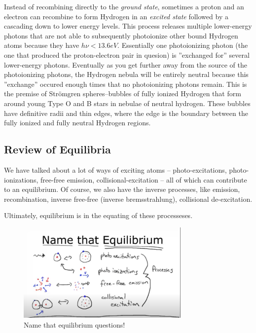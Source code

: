 \documentclass{article}
\begin{document}
Instead of recombining directly to the \emph{ground state}, sometimes a proton and an electron can recombine to form Hydrogen in an \emph{excited state} followed by a cascading down to lower energy levels. This process releases multiple lower-energy photons that are not able to subsequently photoionize other bound Hydrogen atoms because they have $h \nu < 13.6 eV$. Essentially one photoionizing photon (the one that produced the proton-electron pair in quesion) is ''exchanged for'' several lower-energy photons. Eventually as you get further away from the source of the photoionizing photons, the Hydrogen nebula will be entirely neutral because this ''exchange'' occured enough times that no photoionizing photons remain. This is the premise of Str\"{o}mgren spheres--bubbles of fully ionized Hydrogen that form around young Type O and B stars in nebulae of neutral hydrogen. These bubbles have definitive radii and thin edges, where the edge is the boundary between the fully ionized and fully neutral Hydrogen regions.

\subsection{Review of Equilibria}

We have talked about a lot of ways of exciting atoms -- photo-excitations, photo-ionizations, free-free emission, collisional-excitation -- all of which can contribute to an equilibrium. Of course, we also have the inverse processes, like emission, recombination, inverse free-free (inverse bremsstrahlung), collisional de-excitation. 

Ultimately, equilibrium is in the equating of these processeses.

\newcommand{\maxwellian}{\left(\frac{m}{2\pi k T}\right)^{3/2} 4 \pi v^2 e^{-\frac{m v^2}{2 k T}}}

\begin{figure}
    \centering
    \includegraphics[width=0.75\textwidth]{figures/Screen Shot 2020-10-19 at 12.13.06 AM.png}
    \caption{Name that equilibrium questions!}
    \label{fig:equil}
\end{figure}
\end{document}
